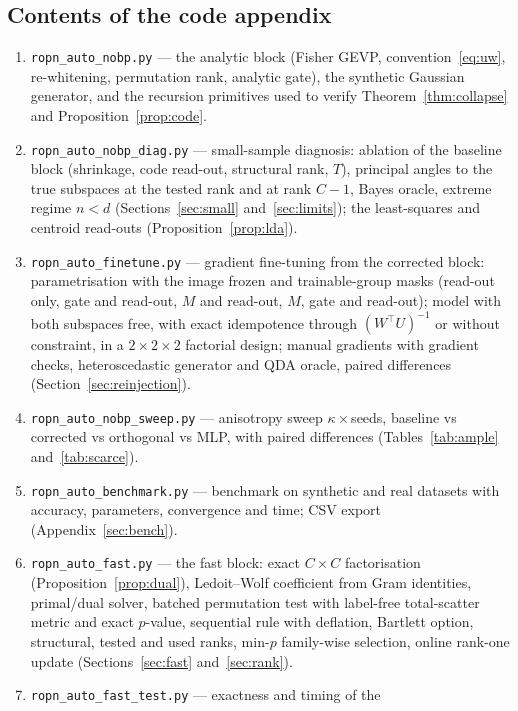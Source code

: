 \documentclass[11pt,a4paper]{article}
\theoremstyle{plain}
\theoremstyle{definition}
\theoremstyle{remark}
\newcommand{\T}{\top}
\begin{document}
\subsection*{Contents of the code appendix}
\begin{enumerate}
  \item \texttt{ropn\_auto\_nobp.py} --- the analytic block (Fisher GEVP,
  convention~\eqref{eq:uw}, re-whitening, permutation rank, analytic gate),
  the synthetic Gaussian generator, and the recursion primitives used to
  verify Theorem~\ref{thm:collapse} and Proposition~\ref{prop:code}.
  \item \texttt{ropn\_auto\_nobp\_diag.py} --- small-sample diagnosis: ablation
  of the baseline block (shrinkage, code read-out, structural rank, $T$),
  principal angles to the true subspaces at the tested rank and at rank
  $C-1$, Bayes oracle, extreme regime $n<d$ (Sections~\ref{sec:small}
  and~\ref{sec:limits}); the least-squares and centroid read-outs
  (Proposition~\ref{prop:lda}).
  \item \texttt{ropn\_auto\_finetune.py} --- gradient fine-tuning from the
  corrected block: parametrisation with the image frozen and
  trainable-group masks (read-out only, gate and read-out, $M$ and
  read-out, $M$, gate and read-out); model with both subspaces free, with
  exact idempotence through $(W^\T U)^{-1}$ or without constraint, in a
  $2\times2\times2$ factorial design; manual gradients with gradient
  checks, heteroscedastic generator and QDA oracle, paired differences
  (Section~\ref{sec:reinjection}).
  \item \texttt{ropn\_auto\_nobp\_sweep.py} --- anisotropy sweep
  $\kappa\times$seeds, baseline vs corrected vs orthogonal vs MLP, with
  paired differences (Tables~\ref{tab:ample} and~\ref{tab:scarce}).
  \item \texttt{ropn\_auto\_benchmark.py} --- benchmark on synthetic and real
  datasets with accuracy, parameters, convergence and time; CSV export
  (Appendix~\ref{sec:bench}).
  \item \texttt{ropn\_auto\_fast.py} --- the fast block: exact $C\times C$
  factorisation (Proposition~\ref{prop:dual}), Ledoit--Wolf coefficient from
  Gram identities, primal/dual solver, batched permutation test with
  label-free total-scatter metric and exact $p$-value, sequential rule with
  deflation, Bartlett option, structural, tested and used ranks, min-$p$
  family-wise selection, online rank-one update
  (Sections~\ref{sec:fast} and~\ref{sec:rank}).
  \item \texttt{ropn\_auto\_fast\_test.py} --- exactness and timing of the

\end{enumerate}
\end{document}
